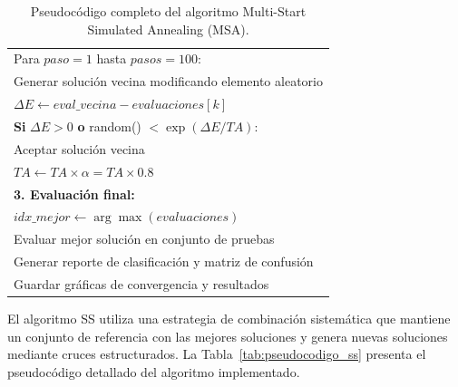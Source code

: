 \begin{table}[htbp]
{\begin{tabular}{|l|l|}
\multicolumn{2}{|l|}{\quad \quad Para $paso = 1$ hasta $pasos=100$:} \\
\multicolumn{2}{|l|}{\quad \quad \quad Generar solución vecina modificando elemento aleatorio} \\
\multicolumn{2}{|l|}{\quad \quad \quad $\Delta E \leftarrow eval\_vecina - evaluaciones[k]$} \\
\multicolumn{2}{|l|}{\quad \quad \quad \textbf{Si} $\Delta E > 0$ \textbf{o} random() $< \exp(\Delta E / TA)$:} \\
\multicolumn{2}{|l|}{\quad \quad \quad \quad Aceptar solución vecina} \\
\multicolumn{2}{|l|}{\quad $TA \leftarrow TA \times \alpha = TA \times 0.8$} \\
\multicolumn{2}{|l|}{\textbf{3. Evaluación final:}} \\
\multicolumn{2}{|l|}{$idx\_mejor \leftarrow \arg\max(evaluaciones)$} \\
\multicolumn{2}{|l|}{Evaluar mejor solución en conjunto de pruebas} \\
\multicolumn{2}{|l|}{Generar reporte de clasificación y matriz de confusión} \\
\multicolumn{2}{|l|}{Guardar gráficas de convergencia y resultados} \\
\hline
\end{tabular}
}
\caption{Pseudocódigo completo del algoritmo Multi-Start Simulated Annealing (MSA).}
\label{tab:pseudocodigo_msa}
\end{table}

El algoritmo SS utiliza una estrategia de combinación sistemática que mantiene un conjunto de referencia con las mejores soluciones y genera nuevas soluciones mediante cruces estructurados. La Tabla~\ref{tab:pseudocodigo_ss} presenta el pseudocódigo detallado del algoritmo implementado.

